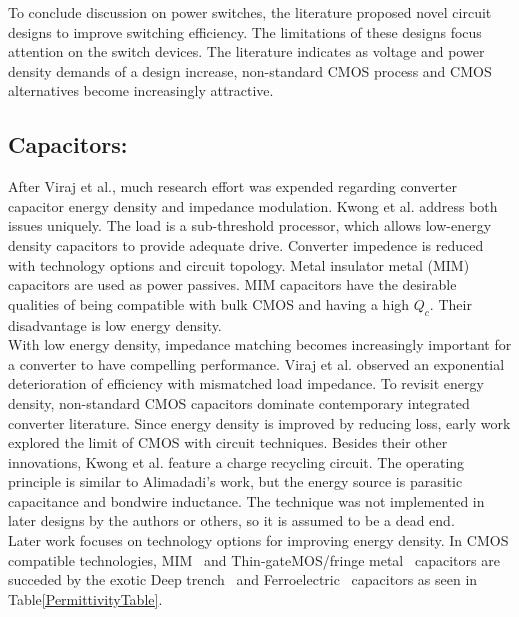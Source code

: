 \documentclass[letterpaper,twocolumn,10pt]{article}
\begin{document}
\indent To conclude discussion on power switches, the literature proposed novel circuit designs to improve switching efficiency. The limitations of these designs focus attention on the switch devices. The literature indicates as voltage and power density demands of a design increase, non-standard CMOS process and CMOS alternatives become increasingly attractive.\\
\subsection{Capacitors: }After Viraj et al.\cite{Viraj2007}, much research effort was expended regarding converter capacitor energy density and impedance modulation. Kwong et al.\cite{Kwong2009} address both issues uniquely. The load is a sub-threshold processor, which allows low-energy density capacitors to provide adequate drive. Converter impedence is reduced with technology options and circuit topology. Metal insulator metal (MIM) capacitors are used as power passives. MIM capacitors have the desirable qualities of being compatible with bulk CMOS and having a high $Q_c$. Their disadvantage is low energy density.\\
With low energy density, impedance matching becomes increasingly important for a converter to have compelling performance. Viraj et al.\cite{Viraj2007} observed an exponential deterioration of efficiency with mismatched load impedance. %
\indent To revisit energy density, non-standard CMOS capacitors dominate contemporary integrated converter literature. Since energy density is improved by reducing loss, early work explored the limit of CMOS with circuit techniques. Besides their other innovations, Kwong et al.\cite{Kwong2009} feature a charge recycling circuit. The operating principle is similar to Alimadadi's work\cite{Alimadadi2008}, but the energy source is parasitic capacitance and bondwire inductance. The technique was not implemented in later designs by the authors or others, so it is assumed to be a dead end.\\
\indent Later work focuses on technology options for improving energy density. In CMOS compatible technologies, MIM~\cite{Kwong2009} and Thin-gateMOS/fringe metal~\cite{Pique2012} capacitors are succeded by the exotic Deep trench~\cite{Pique} and Ferroelectric~\cite{Damak2013} capacitors as seen in Table\ref{PermittivityTable}.\\
\end{document}
